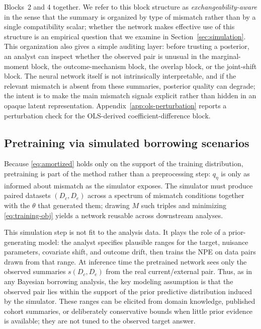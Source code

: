 Blocks~2 and 4 together. We refer to this block structure as
\emph{exchangeability-aware} in the sense that the summary is organized by
type of mismatch rather than by a single compatibility scalar;
whether the network makes effective use of this structure is an empirical
question that we examine in Section~\ref{sec:simulation}.
This organization also gives a simple auditing layer: before trusting a
posterior, an analyst can inspect whether the observed pair is unusual in
the marginal-moment block, the outcome-mechanism block, the overlap block,
or the joint-shift block. The neural network itself is not intrinsically
interpretable, and if the relevant mismatch is absent from these summaries,
posterior quality can degrade; the intent is to make the main mismatch
signals explicit rather than hidden in an opaque latent representation.
Appendix~\ref{app:ols-perturbation} reports a perturbation check for the
OLS-derived coefficient-difference block.

\subsection{Pretraining via simulated borrowing scenarios}
\label{sec:regimes}

Because \eqref{eq:amortized} holds only on the support of the training
distribution, pretraining is part of the method rather than a
preprocessing step: $q_\eta$ is only as informed about mismatch as the
simulator exposes.
The simulator must produce paired datasets $(D_c, D_e)$ across a
spectrum of mismatch conditions together with the $\theta$ that
generated them; drawing $M$ such triples and minimizing
\eqref{eq:training-obj} yields a network reusable across downstream
analyses.

This simulation step is not fit to the analysis data. It plays the role of a
prior-generating model: the analyst specifies plausible ranges for the target,
nuisance parameters, covariate shift, and outcome drift, then trains the NPE
on data pairs drawn from that range. At inference time the pretrained network
sees only the observed summaries $s(D_c,D_e)$ from the real current/external
pair. Thus, as in any Bayesian borrowing analysis, the key modeling
assumption is that the observed pair lies within the support of the prior
predictive distribution induced by the simulator. These ranges can be elicited
from domain knowledge, published cohort summaries, or deliberately conservative
bounds when little prior evidence is available; they are not tuned to the
observed target answer.

